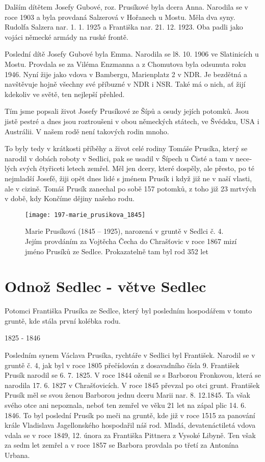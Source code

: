 \documentclass[../dejiny-rodu-prusiku.tex]{subfiles}
\begin{document}
Dalším dítětem Josefy Gubové, roz. Prusíkové byla dcera Anna. Narodila se v roce 1903  a byla provdaná Salzerová v Hořanech u Mostu. Měla dva syny. Rudolfa Salzera nar. 1. 1. 1925 a Františka nar. 21. 12. 1923. Oba padli jako vojáci německé armády na ruské frontě.

Poslední dítě Josefy Gubové byla Emma. Narodila se l8. 10. 1906 ve Slatinicích u Mostu. Provdala se za Viléma Enzmanna a z Chomutova byla odsunuta roku 1946. Nyní žije jako vdova v Bambergu, Marienplatz 2 v NDR. Je bezdětná a navštěvuje hojně všechny své příbuzné v NDR i NSR. Také má o nich, ať žijí kdekoliv ve světě, ten nejlepší přehled.

Tím jsme popsali život Josefy Prusíkové ze Šípů a osudy jejích potomků. Jsou jistě pestré a dnes jsou roztroušeni v obou německých státech, ve Švédsku, USA i Austrálii. V našem rodě není takových rodin mnoho.

To byly tedy v krátkosti příběhy a život celé rodiny Tomáše Prusíka, který se narodil v dobách roboty v Sedlici, pak se usadil v Šípech u Čisté a tam v nece­lých svých čtyřiceti letech zemřel. Měl jen dcery, které dospěly, ale přesto, po té nejmladší Josefě, žiji opět dnes lidé s jménem Prusík i když již ne v naší vlasti, ale v cizině.
Tomáš Prusík zanechal po sobě 157 potomků, z toho již 23 mrtvých v době, kdy Končíme dějiny našeho rodu.

\begin{figure}
\centering
\texttt{[image: 197-marie\_prusikova\_1845]}
\caption{Marie Prusíková (1845 – 1925), narozená v gruntě v Sedlci č. 4. Jejím provdáním za Vojtěcha Čecha do Chrašťovic v roce 1867 mizí jméno Prusíků ze Sedlce. Prokazatelně tam byl rod 352 let}
\label{fig:197-marie_prusikova_1845}
\end{figure}


\section{Odnož Sedlec - větve Sedlec}

Potomci Františka Prusíka ze Sedlce, který byl posledním hospodářem v tomto gruntě, kde stála první kolébka rodu.

1825 - 1846

Posledním synem Václava Prusíka, rychtáře v Sedlici byl František. Narodil se v gruntě č. 4, jak byl v ro­ce 1805 přečíslován z dosavadního čísla 9. František Prusík narodil se 6. 7. 1825. V roce 1844 oženil se s Bar­borou Fronkovou, která se narodila 17. 6. 1827 v Chrašťovicích. V roce 1845 převzal po otci grunt. František Prusík měl se svou ženou Barborou jednu dceru Marii nar. 8. 12.1845. Ta však svého otce ani nepoznala, neboť ten zemřel ve věku 21 let na zápal plic 14. 6. 1846. To byl poslední Prusík po meči na gruntě, kde již v roce 1515 za panování krále Vladislava Jagellonského hospodařil náš rod. Mladá, devatenáctiletá vdova vdala se v roce 1849, 12. února za Františka Pittnera z Vysoké Libyně. Ten však za sedm let zemřel a v roce 1857 se Barbora provdala po třetí za Antonína Urbana.
\end{document}

